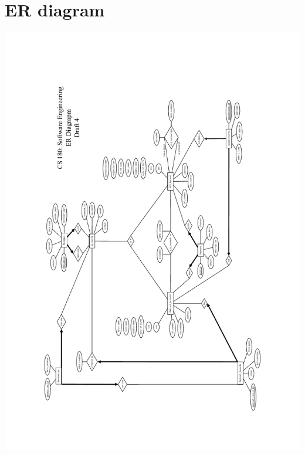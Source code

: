 \documentclass[12pt]{report}
\begin{document}
\chapter{ER diagram}
\includegraphics[scale=0.5]{cs180_ER_draft4.pdf}
\end{document}
